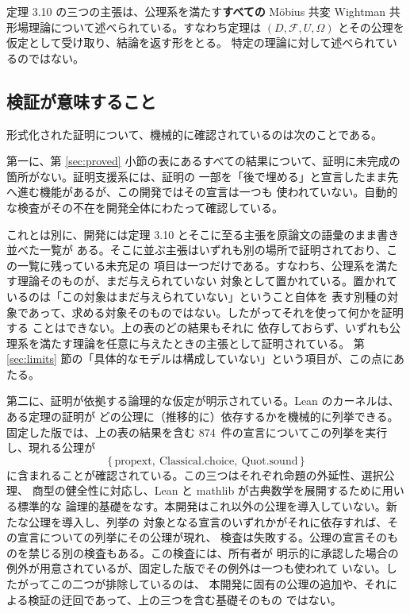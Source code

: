 \documentclass[11pt,a4paper]{article}
\newcommand{\auditcount}{874}
\newcommand{\Fields}{\mathcal{F}}
\newcommand{\Dom}{D}
\theoremstyle{definition}
\begin{document}
定理 3.10 の三つの主張は、公理系を満たす\textbf{すべての}
M\"obius 共変 Wightman 共形場理論について述べられている。すなわち定理は
$(\Dom, \Fields, U, \Omega)$ とその公理を仮定として受け取り、結論を返す形をとる。
特定の理論に対して述べられているのではない。

\subsection{検証が意味すること}

形式化された証明について、機械的に確認されているのは次のことである。

第一に、第 \ref{sec:proved} 小節の表にあるすべての結果について、証明に未完成の箇所がない。証明支援系には、証明の
一部を「後で埋める」と宣言したまま先へ進む機能があるが、この開発ではその宣言は一つも
使われていない。自動的な検査がその不在を開発全体にわたって確認している。

これとは別に、開発には定理 3.10 とそこに至る主張を原論文の語彙のまま書き並べた一覧が
ある。そこに並ぶ主張はいずれも別の場所で証明されており、この一覧に残っている未充足の
項目は一つだけである。すなわち、公理系を満たす理論そのものが、まだ与えられていない
対象として置かれている。置かれているのは「この対象はまだ与えられていない」ということ自体を
表す別種の対象であって、求める対象そのものではない。したがってそれを使って何かを証明する
ことはできない。上の表のどの結果もそれに
依存しておらず、いずれも公理系を満たす理論を任意に与えたときの主張として証明されている。
第 \ref{sec:limits} 節の「具体的なモデルは構成していない」という項目が、この点にあたる。

第二に、証明が依拠する論理的な仮定が明示されている。Lean のカーネルは、ある定理の証明が
どの公理に（推移的に）依存するかを機械的に列挙できる。固定した版では、上の表の結果を含む
\auditcount\ 件の宣言についてこの列挙を実行し、現れる公理が
\[
  \{\,\text{propext},\ \text{Classical.choice},\ \text{Quot.sound}\,\}
\]
に含まれることが確認されている。この三つはそれぞれ命題の外延性、選択公理、
商型の健全性に対応し、Lean と mathlib が古典数学を展開するために用いる標準的な
論理的基礎をなす。本開発はこれ以外の公理を導入していない。新たな公理を導入し、列挙の
対象となる宣言のいずれかがそれに依存すれば、その宣言についての列挙にその公理が現れ、
検査は失敗する。公理の宣言そのものを禁じる別の検査もある。この検査には、所有者が
明示的に承認した場合の例外が用意されているが、固定した版でその例外は一つも使われて
いない。したがってこの二つが排除しているのは、
本開発に固有の公理の追加や、それによる検証の迂回であって、上の三つを含む基礎そのもの
ではない。
\end{document}
